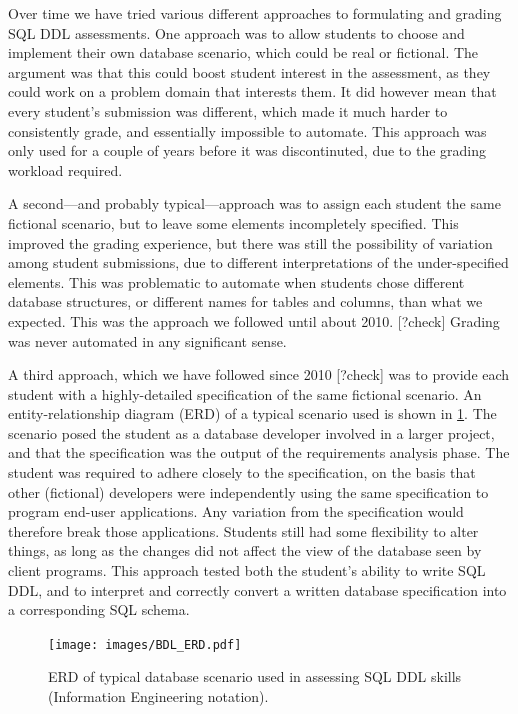 \documentclass[sigconf, authordraft, capitalise]{acmart}
\begin{document}
Over time we have tried various different approaches to formulating and grading SQL DDL assessments. One approach was to allow students to choose and implement their own database scenario, which could be real or fictional. The argument was that this could boost student interest in the assessment, as they could work on a problem domain that interests them. It did however mean that every student's submission was different, which made it much harder to consistently grade, and essentially impossible to automate. This approach was only used for a couple of years before it was discontinuted, due to the grading workload required.

A second---and probably typical---approach was to assign each student the same fictional scenario, but to leave some elements incompletely specified. This improved the grading experience, but there was still the possibility of variation among student submissions, due to different interpretations of the under-specified elements. This was problematic to automate when students chose different database structures, or different names for tables and columns, than what we expected. This was the approach we followed until about 2010. [?check] Grading was never automated in any significant sense.

A third approach, which we have followed since 2010 [?check] was to provide each student with a highly-detailed specification of the same fictional scenario. An entity-relationship diagram (ERD) of a typical scenario used is shown in \cref{fig-ERD}. The scenario posed the student as a database developer involved in a larger project, and that the specification was the output of the requirements analysis phase. The student was required to adhere closely to the specification, on the basis that other (fictional) developers were independently using the same specification to program end-user applications. Any variation from the specification would therefore break those applications. Students still had some flexibility to alter things, as long as the changes did not affect the view of the database seen by client programs. This approach tested both the student's ability to write SQL DDL, and to interpret and correctly convert a written database specification into a corresponding SQL schema.

\begin{figure}
    \centering
    \texttt{[image: images/BDL\_ERD.pdf]} 
    \caption{ERD of typical database scenario used in assessing SQL DDL skills (Information Engineering notation).}
    \label{fig-ERD}
\end{figure}
\end{document}
